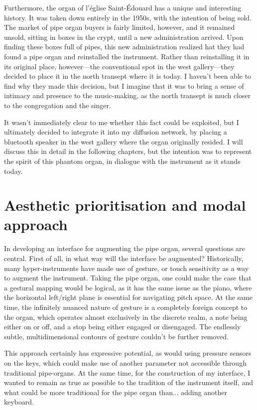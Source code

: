 \documentclass[12pt,twoside,maitrise]{dms_ks}
\theoremstyle{definition}
\begin{document}
Furthermore, the organ of l'église Saint-Édouard has a unique and interesting history. 
It was taken down entirely in the 1950s, with the intention of being sold. 
The market of pipe organ buyers is fairly limited, however, and it remained unsold, sitting in boxes in the crypt, until a new administration arrived. 
Upon finding these boxes full of pipes, this new administration realized hat they had found a pipe organ and reinstalled the instrument. 
Rather than reinstalling it in its original place, however---the conventional spot in the west gallery---they decided to place it in the north transept where it is today. 
I haven't been able to find why they made this decision, but I imagine that it was to bring a sense of intimacy and presence to the music-making, as the north transept is much closer to the congregation and the singer. 

It wasn't immediately clear to me whether this fact could be exploited, but I ultimately decided to integrate it into my diffusion network, by placing a bluetooth speaker in the west gallery where the organ originally resided. 
I will discuss this in detail in the following chapters, but the intention was to represent the spirit of this phantom organ, in dialogue with the instrument as it stands today.

\section{Aesthetic prioritisation and modal approach}

In developing an interface for augmenting the pipe organ, several questions are central.
First of all, in what way will the interface be augmented?
Historically, many hyper-instruments have made use of gesture, or touch sensitivity as a way to augment the instrument.
Taking the pipe organ, one could make the case that a gestural mapping would be logical, as it has the same issue as the piano, where the horizontal left/right plane is essential for navigating pitch space.
At the same time, the infinitely nuanced nature of gesture is a completely foreign concept to the organ, which operates almost exclusively in the discrete realm, a note being either on or off, and a stop being either engaged or disengaged.
The endlessly subtle, multidimensional contours of gesture couldn't be further removed.

This approach certainly has expressive potential, as would using pressure sensors on the keys, which could make use of another parameter not accessible through traditional pipe-organs.
At the same time, for the construction of my interface, I wanted to remain as true as possible to the tradition of the instrument itself, and what could be more traditional for the pipe organ than... adding another keyboard.
\end{document}
